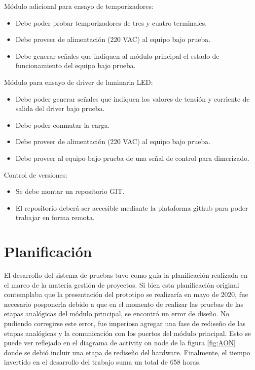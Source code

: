 Módulo adicional para ensayo de temporizadores:

\begin{itemize}
	\item Debe poder probar temporizadores de tres y cuatro terminales.
	\item Debe proveer de alimentación (220 VAC) al equipo bajo prueba.
	\item Debe generar señales que indiquen al módulo principal el estado de funcionamiento del equipo bajo prueba. 
	
\end{itemize}

Módulo para ensayo de driver de luminaria LED:

\begin{itemize}
	\item Debe poder generar señales que indiquen los valores de tensión y corriente de salida del driver bajo prueba.
	\item Debe poder conmutar la carga.
	\item Debe proveer de alimentación (220 VAC) al equipo bajo prueba.
	\item Debe proveer al equipo bajo prueba de una señal de control para dimerizado.
\end{itemize}

Control de versiones:

\begin{itemize}
	\item Se debe montar un repositorio GIT.
	\item El repositorio deberá ser accesible mediante la plataforma github para poder trabajar en forma remota.
\end{itemize}

\section{Planificación}
El desarrollo del sistema de pruebas tuvo como guía la planificación realizada en el marco de la materia gestión de proyectos. Si bien esta planificación original contemplaba que la presentación del prototipo se realizaría en mayo de 2020, fue necesario posponerla debido a que en el momento de realizar las pruebas de las etapas analógicas del módulo principal, se encontró un error de diseño. No pudiendo corregirse este error, fue imperioso agregar una fase de rediseño de las etapas analógicas y la comunicación con los puertos del módulo principal. Esto se puede ver reflejado en el diagrama de activity on node de la figura \ref{fig:AON} donde se debió incluir una etapa de rediseño del hardware. 
Finalmente, el tiempo invertido en el desarrollo del trabajo suma un total de 658 horas.

